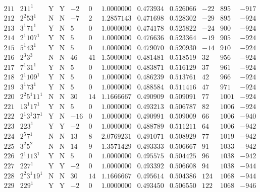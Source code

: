 \documentclass[11pt,reqno,a4letter]{article}
\numberwithin{figure}{section}
\numberwithin{table}{section}
\theoremstyle{plain}
\numberwithin{theorem}{section}
\theoremstyle{definition}
\begin{document}
\begin{table}[h!]
\begin{equation*}
{\begin{array}{cc|cc|ccc|cc|ccc}
 211 & 211^1 & \text{Y} & \text{Y} & -2 & 0 & 1.0000000 & 0.473934 & 0.526066 & -22 & 895 & -917 \\
 212 & 2^2 53^1 & \text{N} & \text{N} & -7 & 2 & 1.2857143 & 0.471698 & 0.528302 & -29 & 895 & -924 \\
 213 & 3^1 71^1 & \text{Y} & \text{N} & 5 & 0 & 1.0000000 & 0.474178 & 0.525822 & -24 & 900 & -924 \\
 214 & 2^1 107^1 & \text{Y} & \text{N} & 5 & 0 & 1.0000000 & 0.476636 & 0.523364 & -19 & 905 & -924 \\
 215 & 5^1 43^1 & \text{Y} & \text{N} & 5 & 0 & 1.0000000 & 0.479070 & 0.520930 & -14 & 910 & -924 \\
 216 & 2^3 3^3 & \text{N} & \text{N} & 46 & 41 & 1.5000000 & 0.481481 & 0.518519 & 32 & 956 & -924 \\
 217 & 7^1 31^1 & \text{Y} & \text{N} & 5 & 0 & 1.0000000 & 0.483871 & 0.516129 & 37 & 961 & -924 \\
 218 & 2^1 109^1 & \text{Y} & \text{N} & 5 & 0 & 1.0000000 & 0.486239 & 0.513761 & 42 & 966 & -924 \\
 219 & 3^1 73^1 & \text{Y} & \text{N} & 5 & 0 & 1.0000000 & 0.488584 & 0.511416 & 47 & 971 & -924 \\
 220 & 2^2 5^1 11^1 & \text{N} & \text{N} & 30 & 14 & 1.1666667 & 0.490909 & 0.509091 & 77 & 1001 & -924 \\
 221 & 13^1 17^1 & \text{Y} & \text{N} & 5 & 0 & 1.0000000 & 0.493213 & 0.506787 & 82 & 1006 & -924 \\
 222 & 2^1 3^1 37^1 & \text{Y} & \text{N} & -16 & 0 & 1.0000000 & 0.490991 & 0.509009 & 66 & 1006 & -940 \\
 223 & 223^1 & \text{Y} & \text{Y} & -2 & 0 & 1.0000000 & 0.488789 & 0.511211 & 64 & 1006 & -942 \\
 224 & 2^5 7^1 & \text{N} & \text{N} & 13 & 8 & 2.0769231 & 0.491071 & 0.508929 & 77 & 1019 & -942 \\
 225 & 3^2 5^2 & \text{N} & \text{N} & 14 & 9 & 1.3571429 & 0.493333 & 0.506667 & 91 & 1033 & -942 \\
 226 & 2^1 113^1 & \text{Y} & \text{N} & 5 & 0 & 1.0000000 & 0.495575 & 0.504425 & 96 & 1038 & -942 \\
 227 & 227^1 & \text{Y} & \text{Y} & -2 & 0 & 1.0000000 & 0.493392 & 0.506608 & 94 & 1038 & -944 \\
 228 & 2^2 3^1 19^1 & \text{N} & \text{N} & 30 & 14 & 1.1666667 & 0.495614 & 0.504386 & 124 & 1068 & -944 \\
 229 & 229^1 & \text{Y} & \text{Y} & -2 & 0 & 1.0000000 & 0.493450 & 0.506550 & 122 & 1068 & -946 \\

\end{array}}
\end{equation*}
\end{table}
\end{document}

